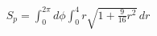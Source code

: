 \documentclass[preview]{standalone}
\begin{document}
\begin{align*}
S_p = \int_0^{2\pi} d\phi \int_0^4 r \sqrt{1 + \frac{9}{16} r^2} \, dr
\end{align*}
\end{document}
